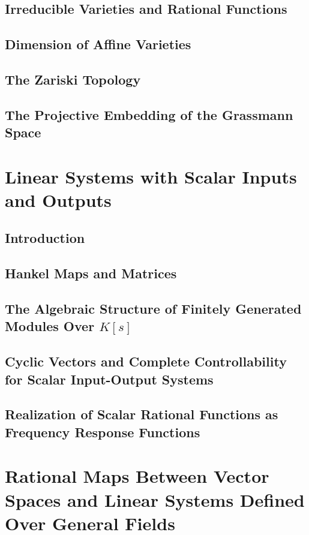 \documentclass[12pt]{book}
\theoremstyle{plain}
\theoremstyle{definition}
\begin{document}
\section{Irreducible Varieties and Rational Functions}

\section{Dimension of Affine Varieties}

\section{The Zariski Topology}

\section{The Projective Embedding of the Grassmann Space}

\chapter{Linear Systems with Scalar Inputs and Outputs}

\section{Introduction}

\section{Hankel Maps and Matrices}

\section{The Algebraic Structure of Finitely Generated Modules Over $K[s]$}

\section{Cyclic Vectors and Complete Controllability for Scalar Input-Output Systems}

\section{Realization of Scalar Rational Functions as Frequency Response Functions}

\chapter{Rational Maps Between Vector Spaces and Linear Systems Defined Over General Fields}
\end{document}

